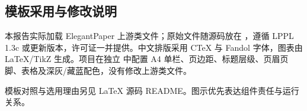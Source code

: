 \subsection*{模板采用与修改说明}
本报告实际加载 ElegantPaper 上游类文件；原始文件随源码放在 ，遵循 LPPL 1.3c 或更新版本，许可证一并提供。中文排版采用 CTeX 与 Fandol 字体，图表由 LaTeX/TikZ 生成。项目在独立  中配置 A4 单栏、页边距、标题层级、页眉页脚、表格及深灰/藏蓝配色，没有修改上游类文件。

模板对照与选用理由另见 LaTeX 源码 README。图示优先表达组件责任与运行关系。
\endinput
